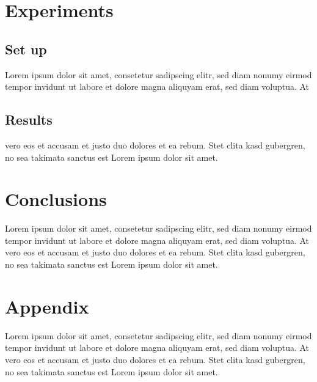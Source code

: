 \documentclass{article}
\begin{document}
    \section{Experiments}
    \subsection{Set up}
        Lorem ipsum dolor sit amet, consetetur sadipscing elitr, sed diam nonumy eirmod
        tempor invidunt ut labore et dolore magna aliquyam erat, sed diam voluptua. At

    \subsection{Results}
        vero eos et accusam et justo duo dolores et ea rebum. Stet clita kasd gubergren,
        no sea takimata sanctus est Lorem ipsum dolor sit amet.
    
    
    \section{Conclusions}
        Lorem ipsum dolor sit amet, consetetur sadipscing elitr, sed diam nonumy eirmod
        tempor invidunt ut labore et dolore magna aliquyam erat, sed diam voluptua. At
        vero eos et accusam et justo duo dolores et ea rebum. Stet clita kasd gubergren,
        no sea takimata sanctus est Lorem ipsum dolor sit amet.
    

    \section{Appendix}
        Lorem ipsum dolor sit amet, consetetur sadipscing elitr, sed diam nonumy eirmod
        tempor invidunt ut labore et dolore magna aliquyam erat, sed diam voluptua. At
        vero eos et accusam et justo duo dolores et ea rebum. Stet clita kasd gubergren,
        no sea takimata sanctus est Lorem ipsum dolor sit amet.
    
\end{document}
